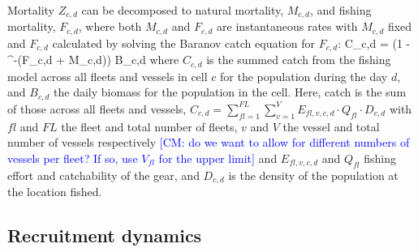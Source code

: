\documentclass[review]{elsarticle}
\let\oldequation\equation
\let\oldendequation\endequation
\renewenvironment{equation}
 {\linenomathNonumbers\oldequation}
 {\oldendequation\endlinenomath}
\begin{document}
Mortality $Z_{c,d}$ can be decomposed to natural mortality, $M_{c,d}$, and
fishing mortality, $F_{c,d}$, where both $M_{c,d}$ and $F_{c,d}$ are
instantaneous rates with $M_{c,d}$ fixed and $F_{c,d}$ calculated by solving
the Baranov catch equation \citep{Hilborn1992b} for $F_{c,d}$:
\begin{equation}
C_{c,d} =  \cdot \left(1 -
	^{-(F_{c,d} + M_{c,d})}\right) \cdot B_{c,d}
\end{equation}
where $C_{c,d}$ is the summed catch from the fishing model across all fleets
and vessels in cell $c$ for the population during the day $d$, and $B_{c,d}$
the daily biomass for the population in the cell. Here, catch is the sum of
those across all fleets and vessels, $C_{c, d} =
\sum\limits_{fl=1}^{FL}\sum\limits_{v=1}^{V} E_{fl, v, c, d} \cdot Q_{fl} \cdot
D_{c, d}$ with $fl$ and $FL$ the fleet and total number of fleets, $v$ and $V$
the vessel and total number of vessels respectively \textcolor{blue}{[CM: do we want to allow for different numbers of vessels per fleet? If so, use $V_{fl}$ for the upper limit]} and $E_{fl,v,c,d}$ and
$Q_{fl}$ fishing effort and catchability of the gear, and $D_{c,d}$ is the
density of the population at the location fished. \\

\subsection{Recruitment dynamics}
\end{document}
